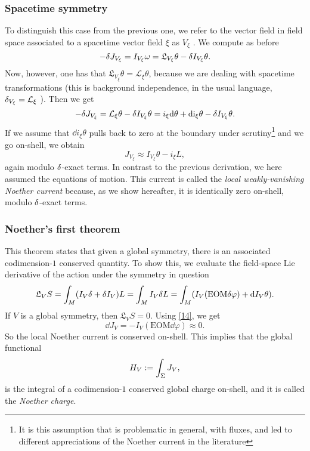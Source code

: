 \subsubsection*{Spacetime symmetry}
To distinguish this case from the previous one, we refer to the vector field in field space associated to a spacetime vector field $\xi$ as $V_\xi $ . We compute as before
\begin{equation}\label{15}
	-\d J_{V_\xi }=I_{V_\xi }\omega=\mathfrak{L}_{V_\xi }\theta-\d I_{V_\xi }\theta.
\end{equation}
Now, however, one has that $\mathfrak{L}_{V_\xi }\theta=\mathcal{L}_\xi \theta$, because we are dealing with spacetime transformations
(this is background independence, in the usual language, $\d_{V_\xi}=\mathcal{L}_\xi $ ). Then we get
\begin{equation}\label{16}
	-\d J_{V_\xi }=\mathcal{L}_\xi \theta-\d I_{V_\xi }\theta=i_\xi \dd \theta+\dd\i_\xi \theta-\d I_{V_\xi }\theta.
\end{equation}
If we assume that $\dd i_\xi \theta$ pulls back to zero at the boundary under scrutiny\footnote{It is this assumption that is problematic in general, with fluxes, and led to different appreciations of the Noether current in the literature} and we go on-shell, we obtain
\begin{equation}\label{17}
	J_{V_\xi }\approx I_{V_\xi }\theta-i_\xi L,
\end{equation}
again modulo $\d $-exact terms. In contrast to the previous derivation, we here assumed the equations of motion. This current is called the \textit{local weakly-vanishing Noether current} because, as we show hereafter, it is identically zero on-shell, modulo $\d $-exact terms.

\subsubsection*{Noether's first theorem}
This theorem states that given a global symmetry, there is an associated codimension-$1$ conserved quantity. To show this, we evaluate the field-space Lie derivative of the action under the symmetry in question
\begin{equation}\label{18}
	\mathfrak{L}_VS=\int_M(I_V\d +\d I_V)L=\int_M I_V\d L=\int_M(I_V(\text{EOM}\d\varphi)+\dd I_V\theta).
\end{equation}
If $V$ is a global symmetry, then $\mathfrak{L}_VS=0$. Using \eqref{14}, we get
\begin{equation}\label{19}
	\dd J_V=-I_V(\text{EOM}\dd\varphi)\approx 0.
\end{equation}
So the local Noether current is conserved on-shell. This implies that the global functional
\begin{equation}\label{20}
	H_V:=\int_\S J_V,
\end{equation}
is the integral of a codimension-$1$ conserved global charge on-shell, and it is called the \textit{Noether charge}.

